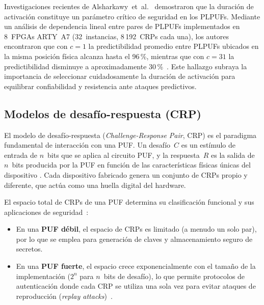 Investigaciones recientes de Alsharkawy~et~al.~\cite{alsharkawy_2024_plpufs}
demostraron que la duración de activación constituye un parámetro crítico de
seguridad en los PLPUFs. Mediante un análisis de dependencia lineal entre
pares de PLPUFs implementados en 8~FPGAs ARTY~A7 (32~instancias, 8\,192~CRPs
cada una), los autores encontraron que con $c = 1$ la predictibilidad
promedio entre PLPUFs ubicados en la misma posición física alcanza hasta el
96\,\%, mientras que con $c = 31$ la predictibilidad disminuye a
aproximadamente 30\,\%~\cite{alsharkawy_2024_plpufs}. Este hallazgo subraya
la importancia de seleccionar cuidadosamente la duración de activación para
equilibrar confiabilidad y resistencia ante ataques predictivos.




\subsection{Modelos de desafío-respuesta (CRP)}
\label{sec:crp}

El modelo de desafío-respuesta (\textit{Challenge-Response Pair}, CRP) es el
paradigma fundamental de interacción con una PUF. Un desafío~$C$ es un
estímulo de entrada de $n$~bits que se aplica al circuito PUF, y la
respuesta~$R$ es la salida de $n$~bits producida por la PUF en función de
las características físicas únicas del dispositivo
\cite{shamsoshoara_2020_puf}. Cada dispositivo fabricado genera un conjunto
de CRPs propio y diferente, que actúa como una huella digital del hardware.

El espacio total de CRPs de una PUF determina su clasificación funcional y
sus aplicaciones de seguridad~\cite{shamsoshoara_2020_puf,
alhamarneh_2024_strengthening}:

\begin{itemize}
  \item En una \textbf{PUF débil}, el espacio de CRPs es limitado (a menudo
    un solo par), por lo que se emplea para generación de claves y
    almacenamiento seguro de secretos.
  \item En una \textbf{PUF fuerte}, el espacio crece exponencialmente con el
    tamaño de la implementación ($2^n$ para $n$~bits de desafío), lo que
    permite protocolos de autenticación donde cada CRP se utiliza una sola
    vez para evitar ataques de reproducción
    (\textit{replay attacks})~\cite{shamsoshoara_2020_puf}.
\end{itemize}


